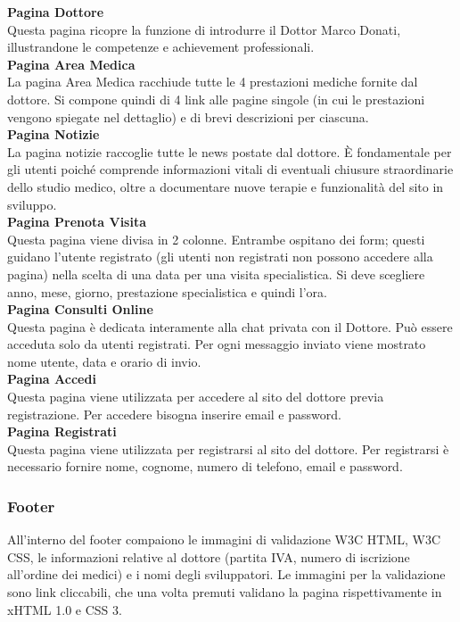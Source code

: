 \textbf{Pagina Dottore} \\
Questa pagina ricopre la funzione di introdurre il Dottor Marco Donati, illustrandone le competenze e achievement professionali. \\

\textbf{Pagina Area Medica} \\
La pagina Area Medica racchiude tutte le 4 prestazioni mediche fornite dal dottore. Si compone quindi di 4 link alle pagine singole (in cui le prestazioni vengono spiegate nel dettaglio) e di brevi descrizioni per ciascuna. \\

\textbf{Pagina Notizie} \\
La pagina notizie raccoglie tutte le news postate dal dottore. È fondamentale per gli utenti poiché comprende informazioni vitali di eventuali chiusure straordinarie dello studio medico, oltre a documentare nuove terapie e funzionalità del sito in sviluppo. \\

\textbf{Pagina Prenota Visita} \\
Questa pagina viene divisa in 2 colonne. Entrambe ospitano dei form;
questi guidano l’utente registrato (gli utenti non registrati non possono accedere alla pagina) nella scelta di una data per una visita specialistica.
Si deve scegliere anno, mese, giorno, prestazione specialistica e quindi l’ora. \\

\textbf{Pagina Consulti Online} \\
Questa pagina è dedicata interamente alla chat privata con il Dottore.
Può essere acceduta solo da utenti registrati.
Per ogni messaggio inviato viene mostrato nome utente, data e orario di invio. \\

\textbf{Pagina Accedi} \\
Questa pagina viene utilizzata per accedere al sito del dottore previa registrazione. Per accedere bisogna inserire email e password. \\

\textbf{Pagina Registrati} \\
Questa pagina viene utilizzata per registrarsi al sito del dottore.  Per registrarsi è necessario fornire nome, cognome, numero di telefono, email e password. \\


\subsubsection{Footer}
All’interno del footer compaiono le immagini di validazione W3C HTML, W3C CSS, le informazioni relative al dottore (partita IVA, numero di iscrizione all’ordine dei medici) e i nomi degli sviluppatori. Le immagini per la validazione sono link cliccabili, che una volta premuti validano la pagina rispettivamente in xHTML 1.0 e CSS 3.


